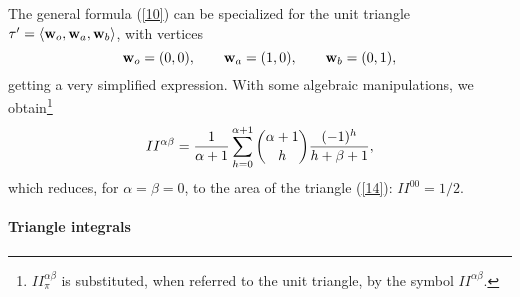 \documentclass[11pt,oneside]{article}	%
\begin{document}
The general formula (\ref{10})  can be specialized
for the unit triangle 
$\tau' = \langle {\bf w}_o, {\bf w}_a, {\bf w}_b \rangle$, with vertices 
\begin{equation} \label{14} 
{\bf w}_o=(0,0),\qquad {\bf w}_a=(1,0),\qquad {\bf w}_b=(0,1),
\end{equation}
getting a very simplified expression.
With some  algebraic manipulations, we obtain\footnote{
$II_\pi^{\alpha\beta}$ is substituted, 
when referred to the unit triangle, by  the symbol
$II^{\alpha\beta}$.
}  
\begin{equation}\label{15} 
II^{\alpha\beta} = 
{1\over{\alpha +1}}
\sum_{h=0}^{\alpha+1}
{\alpha+1\choose  h}
{{(-1)^h}\over{h+\beta+1}},
\end{equation}
which reduces, for $\alpha=\beta=0$, to the area of the triangle (\ref{14}):
$II^{0 0} = 1/2$.


\paragraph{Triangle integrals}
\end{document}

